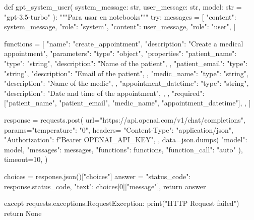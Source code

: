 \begin{APACode}
def gpt_system_user(
    system_message: str, user_message: str, model: str = "gpt-3.5-turbo"
):
    """Para usar en notebooks"""
    try:
        messages = [
            {"content": system_message, "role": "system"},
            {"content": user_message, "role": "user"},
        ]
        
        functions = [
            {
                "name": "create_appointment",
                "description": "Create a medical appointment", 
                "parameters": {
                    "type": "object", 
                    "properties": {
                        "patient_name": { 
                            "type": "string",
                            "description": "Name of the patient",
                        },
                        "patient_email": { 
                            "type": "string",
                            "description": "Email of the patient",
                        },
                        "medic_name": { 
                            "type": "string",
                            "description": "Name of the medic",
                        },
                        "appointment_datetime": { 
                            "type": "string",
                            "description": "Date and time of the appointment",
                        },
                    },
                    "required": ["patient_name", "patient_email", "medic_name", "appointment_datetime"],
                },
            }
        ]
        
        response = requests.post( 
            url="https://api.openai.com/v1/chat/completions", 
            params={"temperature": "0"},
            headers={
                "Content-Type": "application/json", 
                "Authorization": f"Bearer {OPENAI_API_KEY}",
            },
            data=json.dumps({
                "model": model, 
                "messages": messages, 
                "functions": functions, 
                "function_call": "auto"
            }),
            timeout=10,
        )
        
        choices = response.json()["choices"] 
        answer = {
            "status_code": response.status_code,
            "text": choices[0]["message"],
        }
        return answer

    except requests.exceptions.RequestException: 
        print("HTTP Request failed")
        return None
\end{APACode}

